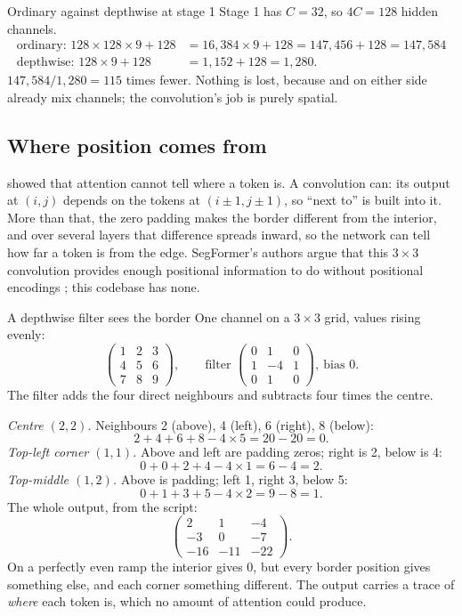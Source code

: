 \begin{worked}[label={we:block:dwcount}]{Ordinary against depthwise at stage 1}
Stage 1 has $C = 32$, so $4C = 128$ hidden channels.
\begin{align*}
  \text{ordinary: } 128\times128\times9 + 128 &= 16{,}384\times9 + 128 = 147{,}456 + 128 = 147{,}584\\
  \text{depthwise: } 128\times9 + 128 &= 1{,}152 + 128 = 1{,}280 .
\end{align*}
$147{,}584/1{,}280 = 115$ times fewer. Nothing is lost, because  and  on either
side already mix channels; the convolution's job is purely spatial.
\end{worked}

\subsection{Where position comes from}

 showed that attention cannot tell where a token is. A convolution can:
its output at $(i, j)$ depends on the tokens at $(i\pm1, j\pm1)$, so ``next to'' is built into it.
More than that, the zero padding makes the border different from the interior, and over several
layers that difference spreads inward, so the network can tell how far a token is from the edge.
SegFormer's authors argue that this $3\times3$ convolution provides enough positional information
to do without positional encodings \citep{xie2021segformer}; this codebase has none.

\begin{worked}[label={we:block:dwtoy}]{A depthwise filter sees the border}
One channel on a $3\times3$ grid, values rising evenly:
\[
  \begin{pmatrix} 1 & 2 & 3\\ 4 & 5 & 6\\ 7 & 8 & 9 \end{pmatrix},
  \qquad \text{filter } \begin{pmatrix} 0 & 1 & 0\\ 1 & -4 & 1\\ 0 & 1 & 0 \end{pmatrix},\ \text{bias } 0 .
\]
The filter adds the four direct neighbours and subtracts four times the centre.

\emph{Centre $(2,2)$.} Neighbours 2 (above), 4 (left), 6 (right), 8 (below):
\[
  2 + 4 + 6 + 8 - 4\times5 = 20 - 20 = 0 .
\]
\emph{Top-left corner $(1,1)$.} Above and left are padding zeros; right is 2, below is 4:
\[
  0 + 0 + 2 + 4 - 4\times1 = 6 - 4 = 2 .
\]
\emph{Top-middle $(1,2)$.} Above is padding; left 1, right 3, below 5:
\[
  0 + 1 + 3 + 5 - 4\times2 = 9 - 8 = 1 .
\]
The whole output, from the script\tagC:
\[
  \begin{pmatrix} 2 & 1 & -4\\ -3 & 0 & -7\\ -16 & -11 & -22 \end{pmatrix}.
\]
On a perfectly even ramp the interior gives 0, but every border position gives something else,
and each corner something different. The output carries a trace of \emph{where} each token is,
which no amount of attention could produce.
\end{worked}

